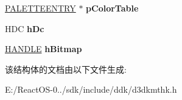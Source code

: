 \begin{DoxyCompactItemize}
\item 
\mbox{\label{struct___d3_d_k_m_t___c_r_e_a_t_e_d_c_f_r_o_m_m_e_m_o_r_y_a930b85b3eaad5b6b808edbb511fa2317}} 
\hyperlink{structtag_p_a_l_e_t_t_e_e_n_t_r_y}{P\+A\+L\+E\+T\+T\+E\+E\+N\+T\+RY} $\ast$ {\bfseries p\+Color\+Table}
\item 
\mbox{\label{struct___d3_d_k_m_t___c_r_e_a_t_e_d_c_f_r_o_m_m_e_m_o_r_y_a374751b18c28b76690642de8acf07e48}} 
H\+DC {\bfseries h\+Dc}
\item 
\mbox{\label{struct___d3_d_k_m_t___c_r_e_a_t_e_d_c_f_r_o_m_m_e_m_o_r_y_a22b660c1663bb032285825a963b1b2d8}} 
\hyperlink{interfacevoid}{H\+A\+N\+D\+LE} {\bfseries h\+Bitmap}
\end{DoxyCompactItemize}


该结构体的文档由以下文件生成\+:\begin{DoxyCompactItemize}
\item 
E\+:/\+React\+O\+S-\/0../sdk/include/ddk/d3dkmthk.\+h\end{DoxyCompactItemize}
